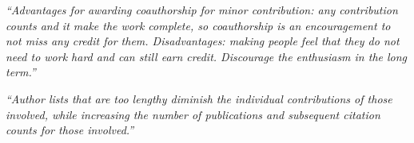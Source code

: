 \documentclass[12pt]{beamer}
\newcommand\ans[1]{{\it ``#1''}}
\newcommand\gap{\vspace{5mm}}
\begin{document}
\begin{frame}
  
  \ans{Advantages for awarding coauthorship for minor contribution: any contribution counts and it make the work complete, so coauthorship is an encouragement to not miss any credit  for  them.   Disadvantages:  making  people  feel  that  they  do  not  need  to  work hard and can still earn credit.  Discourage the enthusiasm in the long term.}

  \gap
  
  \ans{Author  lists  that  are  too  lengthy  diminish  the  individual  contributions  of  those  involved, while increasing the number of publications and subsequent citation counts for those involved.}
  








\end{frame}
\end{document}
